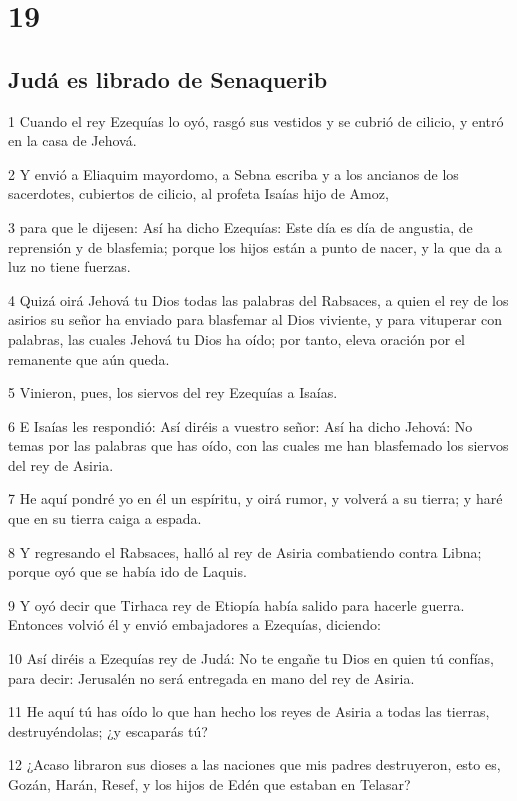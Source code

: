 \chapter{19}

\section*{Judá es librado de Senaquerib }

\par 1 Cuando el rey Ezequías lo oyó, rasgó sus vestidos y se cubrió de cilicio, y entró en la casa de Jehová.
\par 2 Y envió a Eliaquim mayordomo, a Sebna escriba y a los ancianos de los sacerdotes, cubiertos de cilicio, al profeta Isaías hijo de Amoz,
\par 3 para que le dijesen: Así ha dicho Ezequías: Este día es día de angustia, de reprensión y de blasfemia; porque los hijos están a punto de nacer, y la que da a luz no tiene fuerzas.
\par 4 Quizá oirá Jehová tu Dios todas las palabras del Rabsaces, a quien el rey de los asirios su señor ha enviado para blasfemar al Dios viviente, y para vituperar con palabras, las cuales Jehová tu Dios ha oído; por tanto, eleva oración por el remanente que aún queda.
\par 5 Vinieron, pues, los siervos del rey Ezequías a Isaías.
\par 6 E Isaías les respondió: Así diréis a vuestro señor: Así ha dicho Jehová: No temas por las palabras que has oído, con las cuales me han blasfemado los siervos del rey de Asiria.
\par 7 He aquí pondré yo en él un espíritu, y oirá rumor, y volverá a su tierra; y haré que en su tierra caiga a espada.
\par 8 Y regresando el Rabsaces, halló al rey de Asiria combatiendo contra Libna; porque oyó que se había ido de Laquis.
\par 9 Y oyó decir que Tirhaca rey de Etiopía había salido para hacerle guerra. Entonces volvió él y envió embajadores a Ezequías, diciendo:
\par 10 Así diréis a Ezequías rey de Judá: No te engañe tu Dios en quien tú confías, para decir: Jerusalén no será entregada en mano del rey de Asiria.
\par 11 He aquí tú has oído lo que han hecho los reyes de Asiria a todas las tierras, destruyéndolas; ¿y escaparás tú?
\par 12 ¿Acaso libraron sus dioses a las naciones que mis padres destruyeron, esto es, Gozán, Harán, Resef, y los hijos de Edén que estaban en Telasar?
